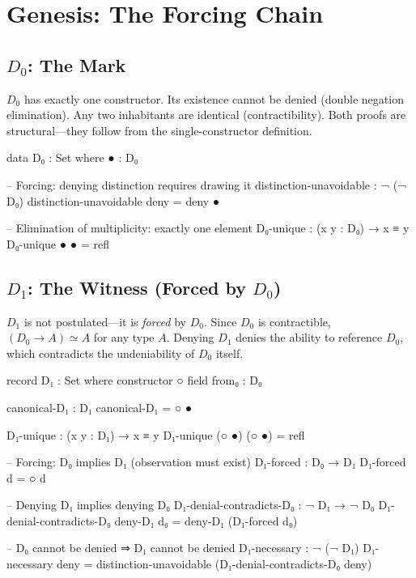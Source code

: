 \documentclass[11pt,a4paper]{article}
\begin{document}
\section{Genesis: The Forcing Chain}
\label{sec:genesis}

\subsection{$D_0$: The Mark}

$D_0$ has exactly one constructor. Its existence cannot be denied (double
negation elimination). Any two inhabitants are identical (contractibility).
Both proofs are structural---they follow from the single-constructor definition.

\begin{code}
data D₀ : Set where
  ● : D₀

-- Forcing: denying distinction requires drawing it
distinction-unavoidable : ¬ (¬ D₀)
distinction-unavoidable deny = deny ●

-- Elimination of multiplicity: exactly one element
D₀-unique : (x y : D₀) → x ≡ y
D₀-unique ● ● = refl
\end{code}

\subsection{$D_1$: The Witness (Forced by $D_0$)}

$D_1$ is not postulated---it is \emph{forced} by $D_0$.
Since $D_0$ is contractible, $(D_0 \to A) \simeq A$ for any type $A$.
Denying $D_1$ denies the ability to reference $D_0$, which contradicts
the undeniability of $D_0$ itself.

\begin{code}
record D₁ : Set where
  constructor ○
  field from₀ : D₀

canonical-D₁ : D₁
canonical-D₁ = ○ ●

D₁-unique : (x y : D₁) → x ≡ y
D₁-unique (○ ●) (○ ●) = refl

-- Forcing: D₀ implies D₁ (observation must exist)
D₁-forced : D₀ → D₁
D₁-forced d = ○ d

-- Denying D₁ implies denying D₀
D₁-denial-contradicts-D₀ : ¬ D₁ → ¬ D₀
D₁-denial-contradicts-D₀ deny-D₁ d₀ = deny-D₁ (D₁-forced d₀)

-- D₀ cannot be denied ⇒ D₁ cannot be denied
D₁-necessary : ¬ (¬ D₁)
D₁-necessary deny = distinction-unavoidable (D₁-denial-contradicts-D₀ deny)
\end{code}
\end{document}
